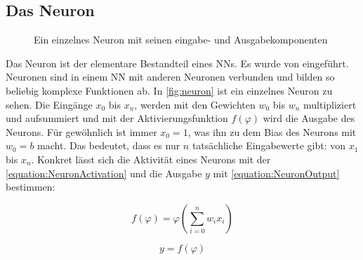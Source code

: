 \subsection{Das Neuron}
\label{chap:neuron}

\begin{figure}
  \centering
  \caption{Ein einzelnes Neuron mit seinen eingabe- und Ausgabekomponenten}
  \label{fig:neuron}
\end{figure}

Das Neuron ist der elementare Bestandteil eines \acp{NN}. Es wurde \citeyear{McCulloch1943} von \citeauthor{McCulloch1943} \cite{McCulloch1943} eingeführt. Neuronen sind in einem \ac{NN} mit anderen Neuronen verbunden und bilden so beliebig komplexe Funktionen ab. In \autoref{fig:neuron} ist ein einzelnes Neuron zu sehen. Die Eingänge $x_{0}$ bis $x_{n}$, werden mit den Gewichten $w_{0}$ bis $w_{n}$ multipliziert und aufsummiert und mit der Aktivierungsfunktion $f(\varphi)$ wird die Ausgabe des Neurons. Für gewöhnlich ist immer $x_{0}=1$, was ihn zu dem Bias des Neurons mit $w_{0}=b$ macht. Das bedeutet, dass es nur $n$ tatsächliche Eingabewerte gibt: von $x_{1}$ bis $x_{n}$. Konkret lässt sich die Aktivität eines Neurons mit der \autoref{equation:NeuronActivation} und die Ausgabe $y$ mit \autoref{equation:NeuronOutput} bestimmen:

\begin{equation}
  f(\varphi) = \varphi(\sum_{i=0}^{n}w_{i}x_{i})
  \label{equation:NeuronActivation}
\end{equation}

\begin{equation}
  y = f(\varphi)
  \label{equation:NeuronOutput}
\end{equation}

